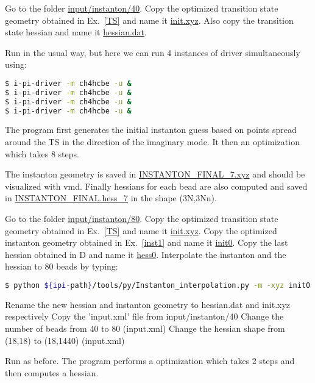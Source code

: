 \documentclass{article}
\begin{document}
\begin{Exercise}[label={inst1},title={First instanton optimization}]

\Question
Go to the folder \url{input/instanton/40}.
Copy the optimized transition state geometry obtained in Ex.~\ref{TS} and name it \url{init.xyz}.
Also copy the transition state hessian and name it \url{hessian.dat}.

Run \ipi{} in the usual way, but here we can run 4 instances of driver simultaneously using:
\begin{lstlisting}[language=bash]
$ i-pi-driver -m ch4hcbe -u &
$ i-pi-driver -m ch4hcbe -u &
$ i-pi-driver -m ch4hcbe -u &
$ i-pi-driver -m ch4hcbe -u &
\end{lstlisting}

The program first generates the initial instanton guess
based on points spread around the TS in the direction of the imaginary mode.
It then an optimization which takes 8 steps.

The instanton geometry is saved in \url{INSTANTON_FINAL_7.xyz} and should be visualized with vmd.
Finally hessians for each bead are also computed and saved in \url{INSTANTON_FINAL.hess_7}
in the shape (3N,3Nn).

\end{Exercise}

\begin{Exercise}[label={inst2},title={Second and subsequent instanton optimizations}]

\Question
Go to the folder \url{input/instanton/80}.
\Question
Copy the optimized transition state geometry obtained in Ex.~\ref{TS} and name it \url{init.xyz}.
\Question
Copy the optimized instanton geometry obtained in Ex.~\ref{inst1} and name it \url{init0}.
\Question
Copy the last hessian obtained in D and name it \url{hess0}.
\Question
Interpolate the instanton and the hessian to 80 beads by typing:
\begin{lstlisting}[language=bash]
$ python ${ipi-path}/tools/py/Instanton_interpolation.py -m -xyz init0 -hess hess0 -n 80
\end{lstlisting}
\Question
Rename the new hessian and instanton geometry to hessian.dat and init.xyz respectively
\Question
Copy the 'input.xml' file from input/instanton/40
\Question
Change the number of beads from 40 to 80 (input.xml)
\Question
Change the hessian shape from (18,18) to (18,1440) (input.xml)

Run as before.  The program performs a optimization which takes 2 steps and then computes a hessian.

\end{Exercise}
\end{document}
